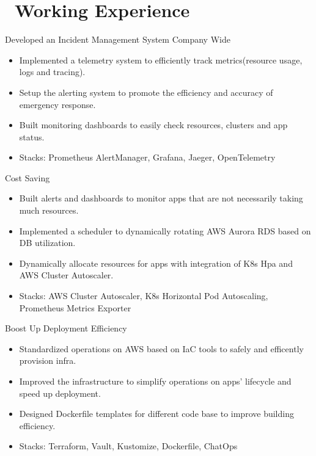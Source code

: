 \documentclass{resume}
\begin{document}
\section{\faUsers\ Working Experience}
Developed an Incident Management System Company Wide
\begin{itemize}
  \item Implemented a telemetry system to efficiently track metrics(resource usage, logs and tracing).
  \item Setup the alerting system to promote the efficiency and accuracy of emergency response.
  \item Built monitoring dashboards to easily check resources, clusters and app status.
  \item Stacks: Prometheus AlertManager, Grafana, Jaeger, OpenTelemetry
\end{itemize}

Cost Saving
\begin{itemize}
  \item Built alerts and dashboards to monitor apps that are not necessarily taking much resources.
  \item Implemented a scheduler to dynamically rotating AWS Aurora RDS based on DB utilization.
  \item Dynamically allocate resources for apps with integration of K8s Hpa and AWS Cluster Autoscaler.
  \item Stacks: AWS Cluster Autoscaler, K8s Horizontal Pod Autoscaling, Prometheus Metrics Exporter
\end{itemize}

Boost Up Deployment Efficiency
\begin{itemize}
  \item Standardized operations on AWS based on IaC tools to safely and efficently provision infra.
  \item Improved the infrastructure to simplify operations on apps' lifecycle and speed up deployment.
  \item Designed Dockerfile templates for different code base to improve building efficiency.
  \item Stacks: Terraform, Vault, Kustomize, Dockerfile, ChatOps
\end{itemize}

\end{document}
